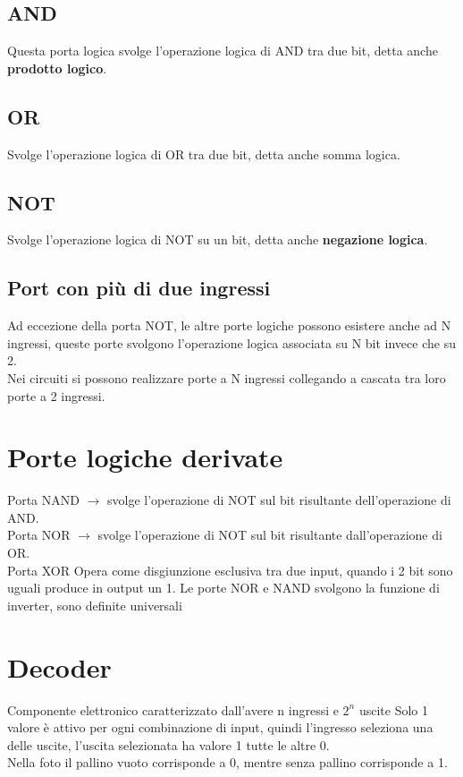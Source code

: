 \documentclass[12pt, a4paper, openany]{book}
\begin{document}
\subsection{AND}
Questa porta logica svolge l'operazione logica di AND tra due bit, detta anche \textbf{prodotto logico}.

\subsection{OR}
Svolge l'operazione logica di OR tra due bit, detta anche somma logica.

\subsection{NOT}
Svolge l'operazione logica di NOT su un bit, detta anche \textbf{negazione logica}.

\subsection{Port con più di due ingressi}
Ad eccezione della porta NOT, le altre porte logiche possono esistere anche ad N ingressi, queste porte
svolgono l'operazione logica associata su N bit invece che su 2.
\\ Nei circuiti si possono realizzare porte a N ingressi collegando a cascata tra loro porte a 2 ingressi.

\section{Porte logiche derivate}
Porta NAND $\to$ svolge l'operazione di NOT sul bit risultante dell'operazione di AND.
\\ Porta NOR $ \to $ svolge l'operazione di NOT sul bit risultante dall'operazione di OR.
\\ Porta XOR Opera come disgiunzione esclusiva tra due input, quando i 2 bit sono uguali produce in output un 1. 
Le porte NOR e NAND svolgono la funzione di inverter, sono definite universali

\section{Decoder}
Componente elettronico caratterizzato dall'avere n ingressi e $2^n$ uscite
Solo 1 valore è attivo per ogni combinazione di input, quindi l'ingresso seleziona 
una delle uscite, l'uscita selezionata ha valore 1 tutte le altre 0.
\\ Nella foto il pallino vuoto corrisponde a 0, mentre senza pallino corrisponde a 1.
\end{document}
